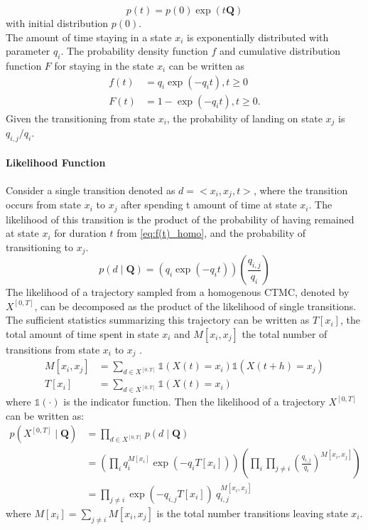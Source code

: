 \begin{equation}
p(t)=p(0) \exp (t\textbf{Q})
\label{eq:ode_sol}
\end{equation}
with initial distribution $ p(0) $.\\
The amount of time staying in a state $ x_{i} $ is exponentially distributed with parameter $ q_{i} $. The probability density function $ f $ and cumulative distribution function $ F $ for staying in the state $ x_{i} $ can be written as \cite{Nodelman1995}
\begin{align}
f(t) & = q_{i} \exp \left(-q_{i} t\right), t\geq 0  \label{eq:f(t)_homo}\\
F(t) & = 1 - \exp \left(-q_{i} t\right), t\geq 0 .
\end{align}
Given the transitioning from state $ x_{i} $, the probability of landing on state $ x_{j} $ is $ q_{i,j}/q_{i} $.
\paragraph*{Likelihood Function}
\label{sec:llh_of_homo}
Consider a single transition denoted as $ d = <x_{i},x_{j},t> $, where the transition occurs from state $ x_{i} $ to $ x_{j} $ after spending t amount of time at state $ x_{i} $. The likelihood of this transition is the product of the probability of having remained at state $ x_{i} $ for duration $ t $ from \autoref{eq:f(t)_homo}, and the probability of transitioning to $ x_{j} $.
\begin{equation}
p(d  \mid \textbf{Q}) = \left( q_{i}\exp(-q_{i}t) \right) \left( \frac{q_{i,j}}{q_{i}} \right)
\end{equation}
The likelihood of a trajectory sampled from a homogenous CTMC, denoted by $ X^{[0,T]} $, can be decomposed as the product of the likelihood of single transitions. The sufficient statistics summarizing this trajectory can be written as $ T[x_{i}] $, the total amount of time spent in state $ x_{i} $ and  $ M[x_{i}, x_{j}] $ the total number of transitions from state $ x_{i} $ to $ x_{j} $ \cite{Nodelman2003}. 
\begin{align}
M[x_i,x_j] & = \sum_{d \in X^{[0,T]}} \mathbb{1}(X(t)=x_i)\mathbb{1}(X(t+h)=x_j)\\
T[x_i] &= \sum_{d \in X^{[0,T]}} \mathbb{1}(X(t)=x_i)
\end{align}
where $ \mathbb{1}(\cdot) $ is the indicator function. Then the likelihood of a trajectory $  X^{\left[0,T\right] } $ can be written as:
\begin{align}
p(X^{[0,T]}  \mid \textbf{Q}) &=  \prod_{d \in X^{[0,T]}} p(d \mid \textbf{Q}) \nonumber\\&=\left(\prod_{ i} q_{i}^{M[x_{i}]} \exp \left(-q_{i} T[x_{i}]\right)\right)\left(\prod_{ i} \prod_{ j \neq i} \left(\frac{q_{i,j}}{q_{i}}\right)^{M\left[x_{i}, x_{j}\right]}\right) \nonumber\\ & = \prod_{j \neq i}  \exp(-q_{i,j}T[x_{i}])\ q_{i,j}^{M[x_{i},x_{j}]}
\label{eq:lh_traj_homo}
\end{align}
where $ M[x_{i}] = \sum_{j \neq i} M[x_{i}, x_{j}] $ is the total number transitions leaving state $ x_{i} $.

